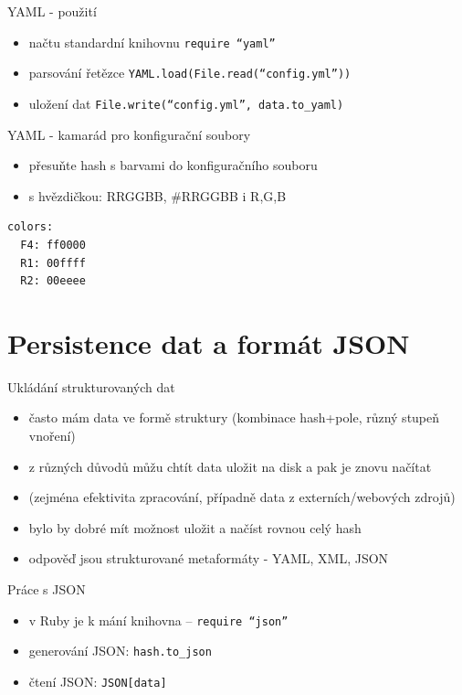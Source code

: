 \documentclass{beamer}
\begin{document}
\begin{frame}[fragile]{YAML - použití}
  \begin{itemize}
    \item načtu standardní knihovnu \texttt{require ``yaml''}
    \item parsování řetězce \texttt{YAML.load(File.read(``config.yml''))}
    \item uložení dat \texttt{File.write(``config.yml'', data.to\_yaml)}
  \end{itemize}
\end{frame}

\begin{frame}[fragile]{YAML - kamarád pro konfigurační soubory}
  \begin{itemize}
    \item přesuňte hash s barvami do konfiguračního souboru
    \item s hvězdičkou: RRGGBB, \#RRGGBB i R,G,B
  \end{itemize}
\begin{verbatim}
colors:
  F4: ff0000
  R1: 00ffff
  R2: 00eeee
\end{verbatim}
\end{frame}

\section{Persistence dat a formát JSON}

\begin{frame}{Ukládání strukturovaných dat}
  \begin{itemize}
    \item často mám data ve formě struktury (kombinace hash+pole, různý stupeň vnoření)
    \item z různých důvodů můžu chtít data uložit na disk a pak je znovu načítat
    \item (zejména efektivita zpracování, případně data z externích/webových zdrojů)
    \item bylo by dobré mít možnost uložit a načíst rovnou celý hash
    \item odpověď jsou strukturované metaformáty - YAML, XML, JSON
  \end{itemize}
\end{frame}

\begin{frame}{Práce s JSON}
  \begin{itemize}
    \item v Ruby je k mání knihovna -- \texttt{require ``json''}
    \item generování JSON: \texttt{hash.to\_json}
    \item čtení JSON: \texttt{JSON[data]}
  \end{itemize}
\end{frame}
\end{document}

